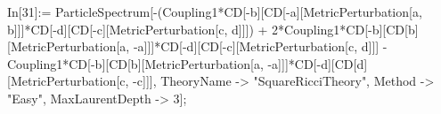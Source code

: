 In[31]:= ParticleSpectrum[-(Coupling1*CD[-b][CD[-a][MetricPerturbation[a, b]]]*CD[-d][CD[-c][MetricPerturbation[c, d]]]) + 2*Coupling1*CD[-b][CD[b][MetricPerturbation[a, -a]]]*CD[-d][CD[-c][MetricPerturbation[c, d]]] - Coupling1*CD[-b][CD[b][MetricPerturbation[a, -a]]]*CD[-d][CD[d][MetricPerturbation[c, -c]]], TheoryName -> "SquareRicciTheory", Method -> "Easy", MaxLaurentDepth -> 3]; 
